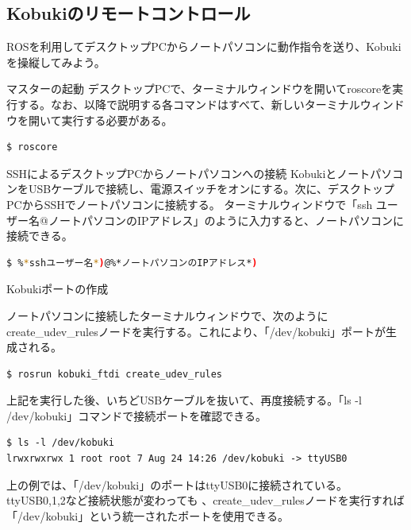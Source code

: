 \begin{itemize}
\section{Kobukiのリモートコントロール}

\setcounter{num}{0}

ROSを利用してデスクトップPCからノートパソコンに動作指令を送り、Kobukiを操縦してみよう。

\circled{\thenum} マスターの起動
デスクトップPCで、ターミナルウィンドウを開いてroscoreを実行する。なお、以降で説明する各コマンドはすべて、新しいターミナルウィンドウを開いて実行する必要がある。

\begin{lstlisting}[language=ROS]
$ roscore
\end{lstlisting}

\circled{\thenum} SSHによるデスクトップPCからノートパソコンへの接続
KobukiとノートパソコンをUSBケーブルで接続し、電源スイッチをオンにする。次に、デスクトップPCからSSHでノートパソコンに接続する。  ターミナルウィンドウで「ssh ユーザー名@ノートパソコンのIPアドレス」のように入力すると、ノートパソコンに接続できる。

\begin{lstlisting}[language=bash]
$ %*sshユーザー名*)@%*ノートパソコンのIPアドレス*)
\end{lstlisting}

\circled{\thenum} Kobukiポートの作成

ノートパソコンに接続したターミナルウィンドウで、次のようにcreate\_udev\_rulesノードを実行する。これにより、「/dev/kobuki」ポートが生成される。

\begin{lstlisting}[language=ROS]
$ rosrun kobuki_ftdi create_udev_rules
\end{lstlisting}


上記を実行した後、いちどUSBケーブルを抜いて、再度接続する。「ls -l  /dev/kobuki」コマンドで接続ポートを確認できる。

\begin{lstlisting}[language=ROS]
$ ls -l /dev/kobuki
lrwxrwxrwx 1 root root 7 Aug 24 14:26 /dev/kobuki -> ttyUSB0
\end{lstlisting}


上の例では、「/dev/kobuki」のポートはttyUSB0に接続されている。ttyUSB0,1,2など接続状態が変わっても   、create\_udev\_rulesノードを実行すれば「/dev/kobuki」という統一されたポートを使用できる。


\end{itemize}
